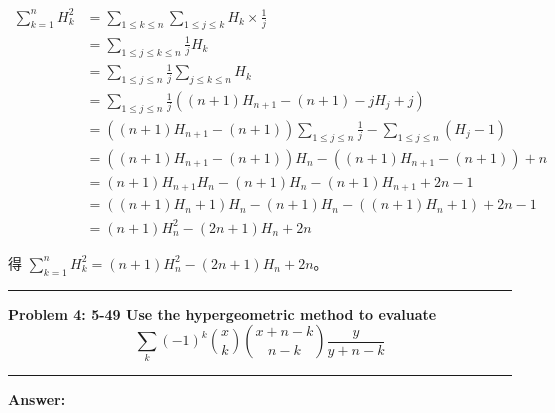 \documentclass[11pt]{article}
\newcommand\question[2]{\vspace{.25in}\hrule\textbf{#1: #2}\vspace{.5em}\hrule\vspace{.10in}}
\renewcommand\part[1]{\vspace{.10in}\textbf{#1}}
\begin{document}
\begin{align*}
\sum_{k=1}^{n} H_k^2 
	&= \sum_{1 \le k \le n} \sum_{1 \le j \le k} H_k \times \frac{1}{j} \\
	&= \sum_{1 \le j \le k \le n} \frac{1}{j} H_k \\
	&= \sum_{1 \le j \le n} \frac{1}{j} \sum_{j \le k \le n} H_k \\
	&= \sum_{1 \le j \le n} \frac{1}{j} \left ( (n+1) H_{n+1} - (n+1)
			- j H_j + j\right ) \\
	&= \left ( (n+1) H_{n+1} - (n+1) \right ) \sum_{1 \le j \le n} \frac{1}{j}
			- \sum_{1 \le j \le n} (H_j - 1) \\
	&= \left ( (n+1) H_{n+1} - (n+1) \right ) H_n
			- \left ( (n+1) H_{n+1} - (n+1) \right ) + n \\
	&= (n+1) H_{n+1} H_n - (n+1) H_n - (n+1) H_{n+1} + 2n - 1 \\
	&= ((n+1) H_{n} + 1) H_n - (n+1) H_n - ((n+1) H_{n} + 1) + 2n - 1 \\
	&= (n+1) H_{n}^2 - (2n+1) H_n + 2n
\end{align*}

得 $\sum_{k=1}^{n} H_k^2 = (n+1) H_{n}^2 - (2n+1) H_n + 2n$。

\newpage

\question{Problem 4} {5-49 Use the hypergeometric method to evaluate
	$$\sum_k (-1)^k \binom{x}{k} \binom{x+n-k}{n-k} \frac{y}{y+n-k}$$
}

\part{Answer:}
\end{document}
